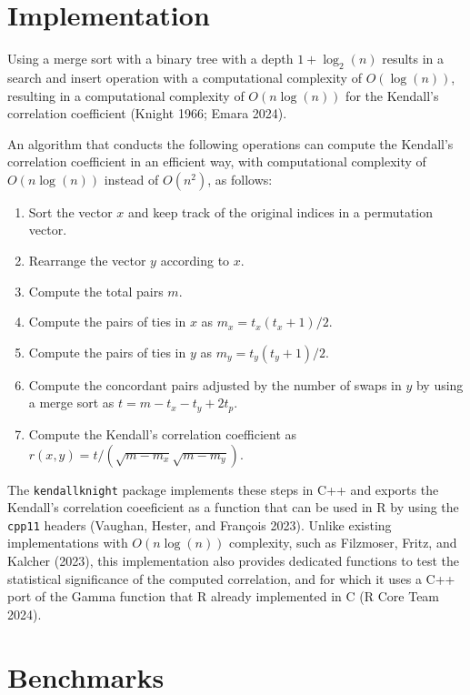 \documentclass[12pt]{article}
\providecommand{\tightlist}{\setlength{\itemsep}{0pt}\setlength{\parskip}{0pt}}
\begin{document}
\section{Implementation}\label{implementation}

Using a merge sort with a binary tree with a depth \(1 + \log_2(n)\)
results in a search and insert operation with a computational complexity
of \(O(\log(n))\), resulting in a computational complexity of
\(O(n \log(n))\) for the Kendall's correlation coefficient (Knight 1966;
Emara 2024).

An algorithm that conducts the following operations can compute the
Kendall's correlation coefficient in an efficient way, with
computational complexity of \(O(n \log(n))\) instead of \(O(n^2)\), as
follows:

\begin{enumerate}
\def\labelenumi{\arabic{enumi}.}
\tightlist
\item
  Sort the vector \(x\) and keep track of the original indices in a
  permutation vector.
\item
  Rearrange the vector \(y\) according to \(x\).
\item
  Compute the total pairs \(m\).
\item
  Compute the pairs of ties in \(x\) as \(m_x = t_x (t_x + 1) / 2\).
\item
  Compute the pairs of ties in \(y\) as \(m_y = t_y (t_y + 1) / 2\).
\item
  Compute the concordant pairs adjusted by the number of swaps in \(y\)
  by using a merge sort as \(t = m - t_x - t_y + 2t_p\).
\item
  Compute the Kendall's correlation coefficient as
  \(r(x,y) = t / (\sqrt{m - m_x} \sqrt{m - m_y})\).
\end{enumerate}

The \texttt{kendallknight} package implements these steps in C++ and
exports the Kendall's correlation coeeficient as a function that can be
used in R by using the \texttt{cpp11} headers (Vaughan, Hester, and
François 2023). Unlike existing implementations with \(O(n \log(n))\)
complexity, such as Filzmoser, Fritz, and Kalcher (2023), this
implementation also provides dedicated functions to test the statistical
significance of the computed correlation, and for which it uses a C++
port of the Gamma function that R already implemented in C (R Core Team
2024).

\section{Benchmarks}\label{benchmarks}
\end{document}
